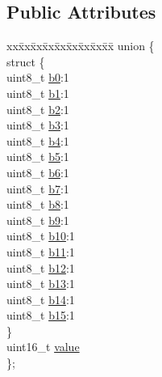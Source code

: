\subsection*{Public Attributes}
\begin{DoxyCompactItemize}
\item 
\begin{tabbing}
xx\=xx\=xx\=xx\=xx\=xx\=xx\=xx\=xx\=\kill
union \{\\
\>struct \{\\
\>\>uint8\_t \hyperlink{struct_b_o_o_l16_a1c75989c92ef896a7056bf995446e8ed}{b0}:1\\
\>\>uint8\_t \hyperlink{struct_b_o_o_l16_a630e67515ea8cf94ccae883690e7a47e}{b1}:1\\
\>\>uint8\_t \hyperlink{struct_b_o_o_l16_a1661ed9958a65512917fdf3199cfe726}{b2}:1\\
\>\>uint8\_t \hyperlink{struct_b_o_o_l16_ad95cffa7a6663cbb83fad76454cdf7d6}{b3}:1\\
\>\>uint8\_t \hyperlink{struct_b_o_o_l16_a1ea7bc124927af4c5547ddfc1d5d0423}{b4}:1\\
\>\>uint8\_t \hyperlink{struct_b_o_o_l16_a27d547eece22106f5580843a67075d15}{b5}:1\\
\>\>uint8\_t \hyperlink{struct_b_o_o_l16_a6534f474b6a98663db15acb06cc44bce}{b6}:1\\
\>\>uint8\_t \hyperlink{struct_b_o_o_l16_a3f8d4ed2cf7b3a1e13655e2037d2caa1}{b7}:1\\
\>\>uint8\_t \hyperlink{struct_b_o_o_l16_a9dde596bdadf85a589643c7da9c7f6ee}{b8}:1\\
\>\>uint8\_t \hyperlink{struct_b_o_o_l16_ae8e1fcafd82cc0d4490a39185af124c1}{b9}:1\\
\>\>uint8\_t \hyperlink{struct_b_o_o_l16_ac44f4602dac15b4761e88c72c70e9269}{b10}:1\\
\>\>uint8\_t \hyperlink{struct_b_o_o_l16_adb855b1e1ff298e3134feb8cbbe4c02e}{b11}:1\\
\>\>uint8\_t \hyperlink{struct_b_o_o_l16_a190bf16641136969b802fbf3416e2d04}{b12}:1\\
\>\>uint8\_t \hyperlink{struct_b_o_o_l16_a36c98eeed6f52983fe6fca57718aeb08}{b13}:1\\
\>\>uint8\_t \hyperlink{struct_b_o_o_l16_ab8070096133feade0861e2de2cd45179}{b14}:1\\
\>\>uint8\_t \hyperlink{struct_b_o_o_l16_a66518572002310954105e32a965ea9f9}{b15}:1\\
\>\} \\
\>uint16\_t \hyperlink{struct_b_o_o_l16_a2f59e7d314cbefe127529184abd1fbb7}{value}\\
\}; \\

\end{tabbing}\end{DoxyCompactItemize}


